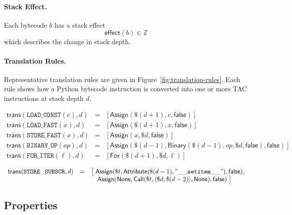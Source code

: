 \paragraph{Stack Effect.}
Each bytecode $b$ has a stack effect
\[
\mathsf{effect}(b) \in \mathbb{Z}
\]
which describes the change in stack depth.

\paragraph{Translation Rules.}
Representative translation rules are given in Figure~\ref{fig:translation-rules}.
Each rule shows how a Python bytecode instruction is converted into one or more TAC instructions at stack depth $d$.

\begin{figure*}[t]
\centering
\[
\begin{array}{rcl}
\mathsf{trans}(\mathtt{LOAD\_CONST}(c), d) 
  &=& [\mathsf{Assign}(\$(d+1), c, \mathsf{false})] \\[1ex]

\mathsf{trans}(\mathtt{LOAD\_FAST}(x), d) 
  &=& [\mathsf{Assign}(\$(d+1), x, \mathsf{false})] \\[1ex]

\mathsf{trans}(\mathtt{STORE\_FAST}(x), d) 
  &=& [\mathsf{Assign}(x, \$d, \mathsf{false})] \\[1ex]

\mathsf{trans}(\mathtt{BINARY\_OP}(op), d) 
  &=& [\mathsf{Assign}(\$(d-1), \mathsf{Binary}(\$(d-1), op, \$d, \mathsf{false}), \mathsf{false})] \\[1ex]

\mathsf{trans}(\mathtt{FOR\_ITER}(\ell), d) 
  &=& [\mathsf{For}(\$(d+1), \$d, \ell)]
\end{array}
\]

\[
\begin{array}{rcl}
\mathsf{trans}(\mathtt{STORE\_SUBSCR}, d) 
  &=& \big[ \;
     \mathsf{Assign}(\$t, \mathsf{Attribute}(\$(d-1),\mathtt{"\_\_setitem\_\_"}), \mathsf{false}), \\ 
  && \quad \mathsf{Assign}(\mathsf{None}, 
             \mathsf{Call}(\$t, \langle \$d, \$(d-2)\rangle, \mathsf{None}), \mathsf{false}) 
     \;\big]
\end{array}
\]

\caption{Translation Rules from Bytecode to TAC}
\label{fig:translation-rules}
\end{figure*}

\subsection{Properties}

